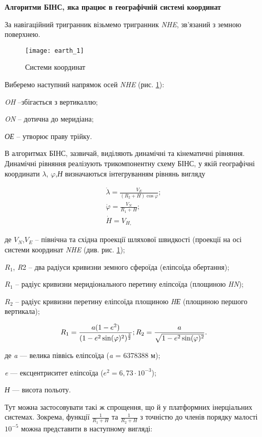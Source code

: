 \textbf{Алгоритми БІНС, яка працює в географічній системі координат}

За навігаційний тригранник візьмемо тригранник \textit{NHE}, зв'язаний з земною поверхнею.
\begin{figure}[here]
\centering
\texttt{[image: earth\_1]}
\caption{Системи координат}
\label{fig:earth}
\end{figure} 
Виберемо наступний напрямок осей   \textit{NHE} (рис. \ref{fig:earth}):
\begin{ESKDexplanation}
\item \textit{OH} --збігається з вертикаллю;
\item \textit{ON} -- дотична до меридіана;
\item \textit{ОЕ} -- утворює праву трійку.
\end{ESKDexplanation}
В алгоритмах БІНС, зазвичай, виділяють динамічні та кінематичні рівняння. 
Динамічні рівняння реалізують трикомпонентну схему БІНС, у якій географічні координати  $\lambda$, 
$\varphi$,\textit{Н} визначаються інтегруванням рівнянь вигляду

\[\begin{array}{l} 
{\dot{\lambda}=\frac{V_{E}}{(R_{2} +H)\cos \varphi} ;} \\ 
{\dot{\varphi}=\frac{V_{N}}{R_{1} +H} ;} \\ 
{\dot{H}=V_{H,}} 
\end{array}\] 
\begin{ESKDexplanation}
\item де  $V_{N}$,$V_{E}$ -- північна та східна проекції шляхової швидкості 
(проекції на осі  системи координат \textit{NHE}  (див. рис. \ref{fig:earth}); 
\item $R_1$, \textit{R}2 -- два радіуси кривизни земного сфероїда (еліпсоїда обертання); 
\item $R_1$ -- радіус кривизни меридіонального перетину еліпсоїда (площиною \textit{HN}); 
\item $R_2$  -- радіус кривизни перетину еліпсоїда площиною \textit{HЕ} (площиною першого вертикала); 
\end{ESKDexplanation}
\[R_{1} =\frac{a(1-e^{2})}{(1-e^{2} \sin(\varphi)^{2})^{\frac{3}{2}}};\\
R_{2} =\frac{a}{\sqrt{1-e^{2} \sin(\varphi)^{2}}}.\] 
\begin{ESKDexplanation}
\item де\textit{ a}  --- велика піввісь  еліпсоїда (\textit{a }=  6378388 м); 
\item \textit{e} --- ексцентриситет еліпсоїда  ($e^{2} = 6,73 \cdot 10^{-3}$);  
\item \textit{Н}  --- висота польоту. 
\end{ESKDexplanation}
Тут можна застосовувати такі ж спрощення, що й у платформних інерціальних системах. 
Зокрема, функції   $\frac{1}{R_{1} +H}$ та $\frac{1}{R_{2} +H} $ 
з точністю до членів порядку малості $10^{-5}$ можна представити 
в наступному вигляді:

